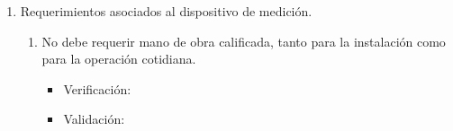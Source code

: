 \documentclass[
11pt, %
]{charter}
\begin{document}
%
\begin{enumerate}
	\item Requerimientos asociados al dispositivo de medición.
		\begin{enumerate}
			\item No debe requerir mano de obra calificada, tanto para la instalación como para la operación cotidiana.
			\begin{itemize}
				\item Verificación:
				\item Validación: 
			\end{itemize}


\end{enumerate}
\end{enumerate}
\end{document}
